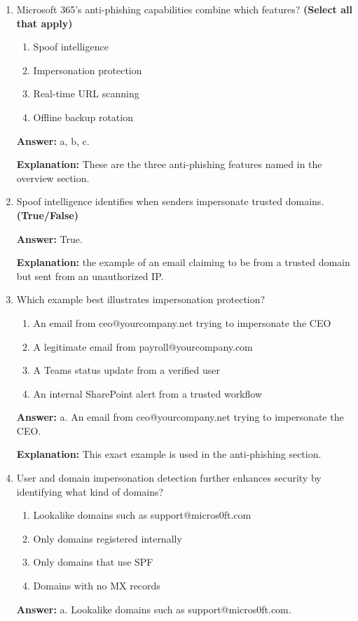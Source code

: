 \documentclass[10pt]{article}
\begin{document}
\begin{enumerate}[leftmargin=*]
\textbf{Explanation:} the following sections examine phishing, malware, and spam in greater detail.

\item Microsoft 365’s anti-phishing capabilities combine which features? \textbf{(Select all that apply)}
\begin{enumerate}[label=\alph*., leftmargin=1.5em]
\item Spoof intelligence
\item Impersonation protection
\item Real-time URL scanning
\item Offline backup rotation
\end{enumerate}
\textbf{Answer:} a, b, c.

\textbf{Explanation:} These are the three anti-phishing features named in the overview section.

\item Spoof intelligence identifies when senders impersonate trusted domains. \textbf{(True/False)}

\textbf{Answer:} True.

\textbf{Explanation:} the example of an email claiming to be from a trusted domain but sent from an unauthorized IP.

\item Which example best illustrates impersonation protection?
\begin{enumerate}[label=\alph*., leftmargin=1.5em]
\item An email from ceo@yourcompany.net trying to impersonate the CEO
\item A legitimate email from payroll@yourcompany.com
\item A Teams status update from a verified user
\item An internal SharePoint alert from a trusted workflow
\end{enumerate}
\textbf{Answer:} a. An email from ceo@yourcompany.net trying to impersonate the CEO.

\textbf{Explanation:} This exact example is used in the anti-phishing section.

\item User and domain impersonation detection further enhances security by identifying what kind of domains?
\begin{enumerate}[label=\alph*., leftmargin=1.5em]
\item Lookalike domains such as support@micros0ft.com
\item Only domains registered internally
\item Only domains that use SPF
\item Domains with no MX records
\end{enumerate}
\textbf{Answer:} a. Lookalike domains such as support@micros0ft.com.


\end{enumerate}
\end{document}
